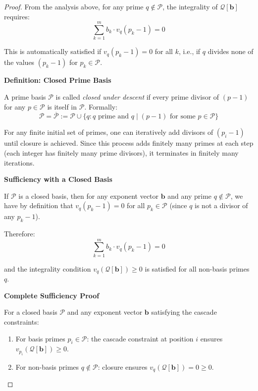 \begin{proof}
From the analysis above, for any prime $q \notin \mathcal{P}$, the integrality of $\mathcal{Q}[\mathbf{b}]$ requires:
\begin{equation}
\sum_{k=1}^m b_k \cdot v_q(p_k - 1) = 0
\end{equation}

This is automatically satisfied if $v_q(p_k - 1) = 0$ for all $k$, i.e., if $q$ divides none of the values $(p_k - 1)$ for $p_k \in \mathcal{P}$.

\noindent \textbf{Definition: Closed Prime Basis}

A prime basis $\mathcal{P}$ is called \emph{closed under descent} if every prime divisor of $(p - 1)$ for any $p \in \mathcal{P}$ is itself in $\mathcal{P}$. Formally:
\begin{equation}
\mathcal{P} = \overline{\mathcal{P}} := \mathcal{P} \cup \{q : q \text{ prime and } q \mid (p-1) \text{ for some } p \in \mathcal{P}\}
\end{equation}

For any finite initial set of primes, one can iteratively add divisors of $(p_i - 1)$ until closure is achieved. Since this process adds finitely many primes at each step (each integer has finitely many prime divisors), it terminates in finitely many iterations.

\noindent \textbf{Sufficiency with a Closed Basis}

If $\mathcal{P}$ is a closed basis, then for any exponent vector $\mathbf{b}$ and any prime $q \notin \mathcal{P}$, we have by definition that $v_q(p_k - 1) = 0$ for all $p_k \in \mathcal{P}$ (since $q$ is not a divisor of any $p_k - 1$).

Therefore:
\begin{equation}
\sum_{k=1}^m b_k \cdot v_q(p_k - 1) = 0
\end{equation}

and the integrality condition $v_q(\mathcal{Q}[\mathbf{b}]) \geq 0$ is satisfied for all non-basis primes $q$.

\noindent \textbf{Complete Sufficiency Proof}

For a closed basis $\mathcal{P}$ and any exponent vector $\mathbf{b}$ satisfying the cascade constraints:
\begin{enumerate}
\item For basis primes $p_i \in \mathcal{P}$: the cascade constraint at position $i$ ensures $v_{p_i}(\mathcal{Q}[\mathbf{b}]) \geq 0$.
\item For non-basis primes $q \notin \mathcal{P}$: closure ensures $v_q(\mathcal{Q}[\mathbf{b}]) = 0 \geq 0$.
\end{enumerate}


\end{proof}
